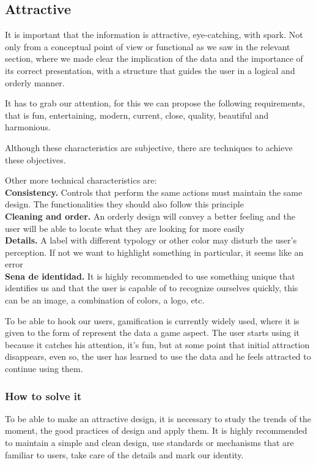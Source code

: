 \subsection{Attractive}
It is important that the information is attractive, eye-catching, with spark. Not only from a conceptual point of view
or functional as we saw in the relevant section, where we made clear the implication of the data and the importance
of its correct presentation, with a structure that guides the user in a logical and orderly manner.

It has to grab our attention, for this we can propose the following requirements, that is fun, entertaining,
modern, current, close, quality, beautiful and harmonious.

Although these characteristics are subjective, there are techniques to achieve these objectives.

Other more technical characteristics are: \\

\textbf{Consistency.} Controls that perform the same actions must maintain the same design. The functionalities
they should also follow this principle \\

\textbf{Cleaning and order.} An orderly design will convey a better feeling and the user will be able to locate what they are looking for
more easily\\

\textbf{Details.} A label with different typology or other color may disturb the user's perception. If not
we want to highlight something in particular, it seems like an error \\

\textbf{Sena de identidad.} It is highly recommended to use something unique that identifies us and that the user is capable of
to recognize ourselves quickly, this can be an image, a combination of colors, a logo, etc.

To be able to hook our users, gamification is currently widely used, where it is given to the form of
represent the data a game aspect. The user starts using it because it catches his attention, it's fun,
but at some point that initial attraction disappears, even so, the user has learned to use the data and
he feels attracted to continue using them.

\subsubsection{How to solve it} 
To be able to make an attractive design, it is necessary to study the trends of the moment, the good practices of design and apply them.
It is highly recommended to maintain a simple and clean design, use standards or mechanisms that are familiar to users,
take care of the details and mark our identity.
